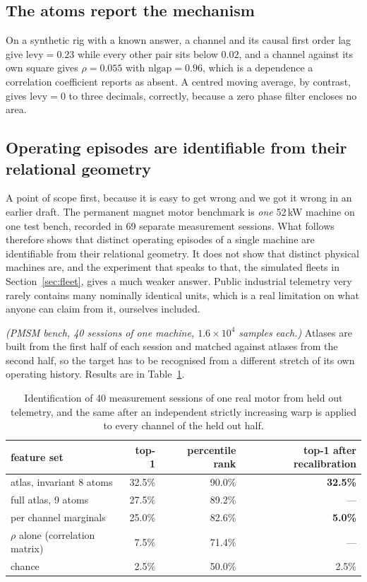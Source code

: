 \documentclass[11pt]{article}
\begin{document}
\subsection{The atoms report the mechanism}

On a synthetic rig with a known answer, a channel and its causal first order
lag give $\mathrm{levy}=0.23$ while every other pair sits below $0.02$, and a
channel against its own square gives $\rho=0.055$ with
$\mathrm{nlgap}=0.96$, which is a dependence a correlation coefficient reports
as absent. A centred moving average, by contrast, gives $\mathrm{levy}=0$ to
three decimals, correctly, because a zero phase filter encloses no area.

\subsection{Operating episodes are identifiable from their relational geometry}

A point of scope first, because it is easy to get wrong and we got it wrong in
an earlier draft. The permanent magnet motor benchmark is \emph{one} 52\,kW
machine on one test bench, recorded in 69 separate measurement sessions. What
follows therefore shows that distinct operating episodes of a single machine are
identifiable from their relational geometry. It does not show that distinct
physical machines are, and the experiment that speaks to that, the simulated
fleets in Section~\ref{sec:fleet}, gives a much weaker answer. Public
industrial telemetry very rarely contains many nominally identical units, which
is a real limitation on what anyone can claim from it, ourselves included.

\emph{(PMSM bench, 40 sessions of one machine, $1.6\times10^4$ samples each.)}
Atlases are built from the first half of each session and matched against
atlases from the second half, so the target has to be recognised from a
different stretch of its own operating history. Results are in
Table~\ref{tab:fp}.

\begin{table}[t]
\centering
\begin{tabular}{lrrr}
\toprule
feature set & top-1 & percentile rank & top-1 after recalibration \\
\midrule
atlas, invariant 8 atoms  & 32.5\% & 90.0\% & \textbf{32.5\%} \\
full atlas, 9 atoms       & 27.5\% & 89.2\% & --- \\
per channel marginals     & 25.0\% & 82.6\% & \textbf{5.0\%} \\
$\rho$ alone (correlation matrix) & 7.5\% & 71.4\% & --- \\
chance                    & 2.5\%  & 50.0\% & 2.5\% \\
\bottomrule
\end{tabular}
\caption{Identification of 40 measurement sessions of one real motor from held out telemetry, and
the same after an independent strictly increasing warp is applied to every
channel of the held out half.}
\label{tab:fp}
\end{table}
\end{document}
